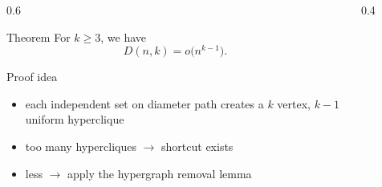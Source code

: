 
\begin{frame}
    \begin{columns}

    \begin{column}{0.6\textwidth}
    
        \begin{theorem}{Theorem}
        For \( k \geq 3 \), we have
        \[
        D(n,k) = o\bigl(n^{k-1}\bigr).
        \]
        \end{theorem}
        
        \begin{heading}{Proof idea}
        
            \begin{itemize}
                \item each independent set on diameter path creates a \(k\) vertex, \(k-1\) uniform hyperclique
                \item too many hypercliques \(\to\) shortcut exists
                \item less \(\to\) apply the hypergraph removal lemma
            \end{itemize}
            
        \end{heading}
    
    \end{column}
    \begin{column}{0.4\textwidth}
    
        \begin{figure}
            \centering
            
        \end{figure}
        
    \end{column}
    \end{columns}
    
    \begin{figure}
        \centering
        
    \end{figure}
\end{frame}


